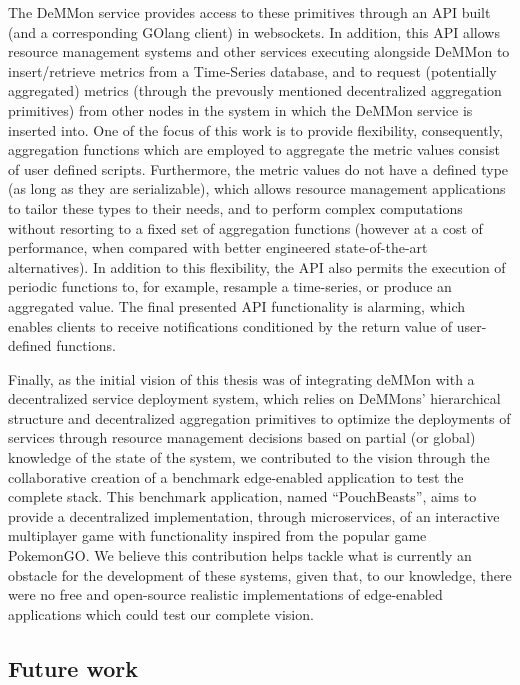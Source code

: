 The DeMMon service provides access to these primitives through an API built (and a corresponding GOlang client) in websockets. In addition, this API allows resource management systems and other services executing alongside DeMMon to insert/retrieve metrics from a Time-Series database, and to request (potentially aggregated) metrics (through the prevously mentioned decentralized aggregation primitives) from other nodes in the system in which the DeMMon service is inserted into. One of the focus of this work is to provide flexibility, consequently, aggregation functions which are employed to aggregate the metric values consist of user defined scripts. Furthermore, the metric values do not have a defined type (as long as they are serializable), which allows resource management applications to tailor these types to their needs, and to perform complex computations without resorting to a fixed set of aggregation functions (however at a cost of performance, when compared with better engineered state-of-the-art alternatives). In addition to this flexibility, the API also permits the execution of periodic functions to, for example, resample a time-series, or produce an aggregated value. The final presented API functionality is  alarming, which enables clients to receive notifications conditioned by the return value of user-defined functions. 

Finally, as the initial vision of this thesis was of integrating deMMon with a decentralized service deployment system, which relies on DeMMons' hierarchical structure and decentralized aggregation primitives to optimize the deployments of services through resource management decisions based on partial (or global) knowledge of the state of the system, we contributed to the vision through the collaborative creation of a benchmark edge-enabled application to test the complete stack. This benchmark application, named ``PouchBeasts'', aims to provide a decentralized implementation, through microservices, of an interactive multiplayer game with functionality  inspired from the popular game PokemonGO. We believe this contribution helps tackle what is currently an obstacle for the development of these systems, given that, to our knowledge, there were no free and open-source realistic implementations of edge-enabled applications which could test our complete vision.

\subsection{Future work}

